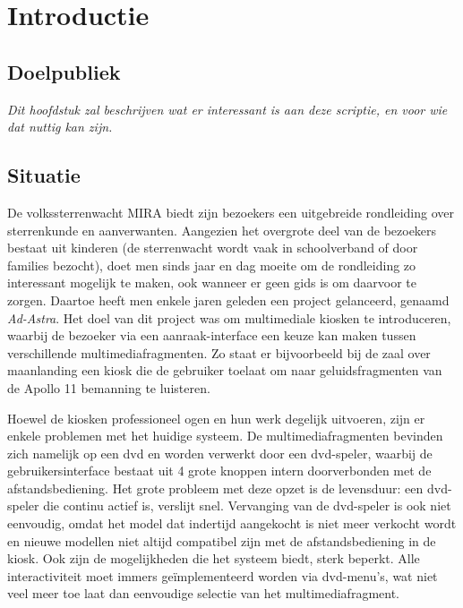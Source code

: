 \part{Introductie}
\label{introductie}


%
%

\chapter{Doelpubliek}
\label{introductie:doelpubliek}

\textit{Dit hoofdstuk zal beschrijven wat er interessant is aan deze scriptie, en voor wie dat nuttig kan zijn.}


%
%

\chapter{Situatie}
\label{introductie:situatie}

De volkssterrenwacht MIRA biedt zijn bezoekers een uitgebreide rondleiding over sterrenkunde en aanverwanten. Aangezien het overgrote deel van de bezoekers bestaat uit kinderen (de sterrenwacht wordt vaak in schoolverband of door families bezocht), doet men sinds jaar en dag moeite om de rondleiding zo interessant mogelijk te maken, ook wanneer er geen gids is om daarvoor te zorgen. Daartoe heeft men enkele jaren geleden een project gelanceerd, genaamd \emph{Ad-Astra}. Het doel van dit project was om multimediale kiosken te introduceren, waarbij de bezoeker via een aanraak-interface een keuze kan maken tussen verschillende multimediafragmenten. Zo staat er bijvoorbeeld bij de zaal over maanlanding een kiosk die de gebruiker toelaat om naar geluidsfragmenten van de Apollo 11 bemanning te luisteren.

Hoewel de kiosken professioneel ogen en hun werk degelijk uitvoeren, zijn er enkele problemen met het huidige systeem. De multimediafragmenten bevinden zich namelijk op een \ac{dvd} en worden verwerkt door een \acs{dvd}-speler, waarbij de gebruikersinterface bestaat uit 4 grote knoppen intern doorverbonden met de afstandsbediening.
Het grote probleem met deze opzet is de levensduur: een \acs{dvd}-speler die continu actief is, verslijt snel. Vervanging van de \acs{dvd}-speler is ook niet eenvoudig, omdat het model dat indertijd aangekocht is niet meer verkocht wordt en nieuwe modellen niet altijd compatibel zijn met de afstandsbediening in de kiosk.
Ook zijn de mogelijkheden die het systeem biedt, sterk beperkt. Alle interactiviteit moet immers geïmplementeerd worden via \acs{dvd}-menu's, wat niet veel meer toe laat dan eenvoudige selectie van het multimediafragment.

